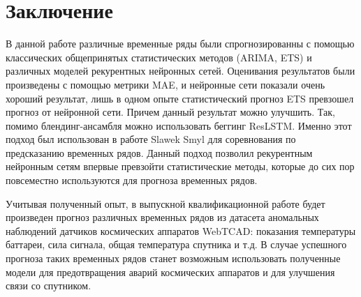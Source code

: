 \documentclass[12pt, a4paper]{article} %
\begin{document}
\newpage
\section{Заключение}

В данной работе различные временные ряды были спрогнозированны с помощью классических общепринятых статистических методов (ARIMA, ETS) и различных моделей рекурентных нейронных сетей. Оценивания результатов были произведены с помощью метрики MAE, и нейронные сети показали очень хороший результат, лишь в одном опыте статистический прогноз ETS превзошел прогноз от нейронной сети. Причем данный результат можно улучшить. Так, помимо блендинг-ансамбля можно использовать беггинг ResLSTM. Именно этот подход был использован в работе Slawek Smyl для соревнования по предсказанию временных рядов. Данный подход позволил рекурентным нейронным сетям впервые превзойти\cite{Slawek} статистические методы, которые до сих пор повсеместно используются для прогноза временных рядов. 

Учитывая полученный опыт, в выпускной квалификационной работе будет произведен прогноз различных временных рядов из датасета аномальных наблюдений датчиков космических аппаратов WebTCAD: показания температуры баттареи, сила сигнала, общая температура спутника и т.д. В случае успешного прогноза таких временных рядов станет возможным использовать полученные модели для предотвращения аварий космических аппаратов и для улучшения связи со спутником. 



\newpage
\nocite{*}

\newpage
\end{document}
